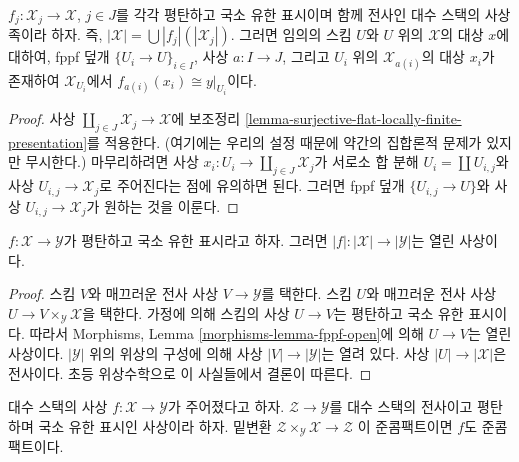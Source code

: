 \begin{lemma}
\label{lemma-surjective-family-flat-locally-finite-presentation}
$f_j : \mathcal{X}_j \to \mathcal{X}$, $j \in J$를 각각 평탄하고 국소
유한 표시이며 함께 전사인 대수 스택의 사상족이라 하자. 즉,
$|\mathcal{X}| = \bigcup |f_j|(|\mathcal{X}_j|)$.
그러면 임의의 스킴 $U$와 $U$ 위의 $\mathcal{X}$의 대상 $x$에 대하여,
fppf 덮개 $\{U_i \to U\}_{i \in I}$, 사상 $a : I \to J$, 그리고
$U_i$ 위의 $\mathcal{X}_{a(i)}$의 대상 $x_i$가 존재하여
$\mathcal{X}_{U_i}$에서
$f_{a(i)}(x_i) \cong y|_{U_i}$이다.%
\end{lemma}

\begin{proof}
사상 $\coprod_{j \in J} \mathcal{X}_j \to \mathcal{X}$에 보조정리
\ref{lemma-surjective-flat-locally-finite-presentation}를 적용한다.
(여기에는 우리의 설정 때문에 약간의 집합론적 문제가 있지만 무시한다.)
마무리하려면 사상
$x_i : U_i \to \coprod_{j \in J} \mathcal{X}_j$가 서로소 합 분해
$U_i = \coprod U_{i, j}$와 사상 $U_{i, j} \to \mathcal{X}_j$로
주어진다는 점에 유의하면 된다. 그러면 fppf 덮개
$\{U_{i, j} \to U\}$와 사상 $U_{i, j} \to \mathcal{X}_j$가 원하는
것을 이룬다.
\end{proof}

\begin{lemma}
\label{lemma-fppf-open}
$f : \mathcal{X} \to \mathcal{Y}$가 평탄하고 국소 유한 표시라고 하자.
그러면 $|f| : |\mathcal{X}| \to |\mathcal{Y}|$는 열린 사상이다.
\end{lemma}

\begin{proof}
스킴 $V$와 매끄러운 전사 사상 $V \to \mathcal{Y}$를 택한다. 스킴
$U$와 매끄러운 전사 사상
$U \to V \times_\mathcal{Y} \mathcal{X}$을 택한다. 가정에 의해 스킴의
사상 $U \to V$는 평탄하고 국소 유한 표시이다. 따라서 Morphisms,
Lemma \ref{morphisms-lemma-fppf-open}에 의해 $U \to V$는 열린 사상이다.
$|\mathcal{Y}|$ 위의 위상의 구성에 의해 사상
$|V| \to |\mathcal{Y}|$는 열려 있다. 사상
$|U| \to |\mathcal{X}|$은 전사이다. 초등 위상수학으로 이 사실들에서
결론이 따른다.
\end{proof}

\begin{lemma}
\label{lemma-descent-quasi-compact}
대수 스택의 사상 $f : \mathcal{X} \to \mathcal{Y}$가 주어졌다고 하자.
$\mathcal{Z} \to \mathcal{Y}$를 대수 스택의 전사이고 평탄하며 국소
유한 표시인 사상이라 하자. 밑변환
$\mathcal{Z} \times_\mathcal{Y} \mathcal{X} \to \mathcal{Z}$
이 준콤팩트이면 $f$도 준콤팩트이다.
\end{lemma}

